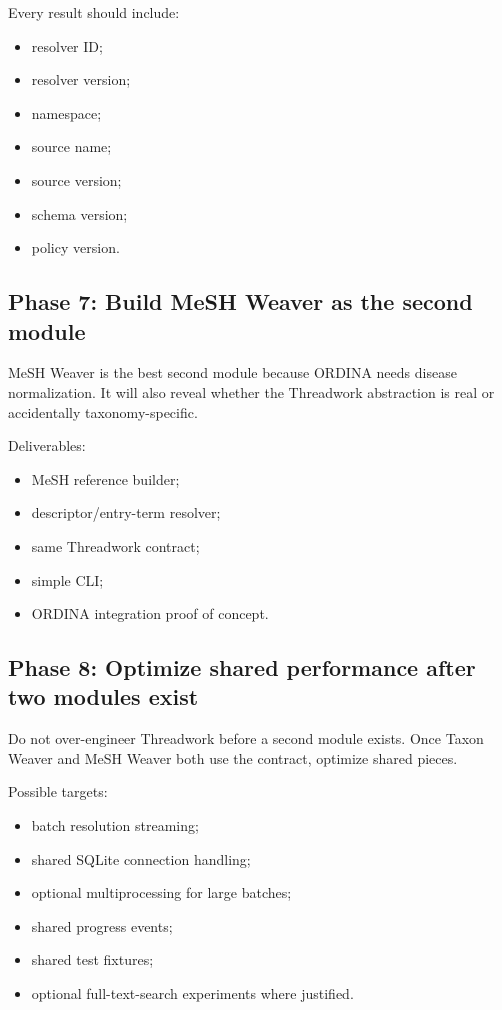 \documentclass[11pt,a4paper]{article}
\begin{document}
Every result should include:

\begin{itemize}
  \item resolver ID;
  \item resolver version;
  \item namespace;
  \item source name;
  \item source version;
  \item schema version;
  \item policy version.
\end{itemize}

\subsection{Phase 7: Build MeSH Weaver as the second module}

MeSH Weaver is the best second module because ORDINA needs disease normalization. It will also reveal whether the Threadwork abstraction is real or accidentally taxonomy-specific.

Deliverables:

\begin{itemize}
  \item MeSH reference builder;
  \item descriptor/entry-term resolver;
  \item same Threadwork contract;
  \item simple CLI;
  \item ORDINA integration proof of concept.
\end{itemize}

\subsection{Phase 8: Optimize shared performance after two modules exist}

Do not over-engineer Threadwork before a second module exists. Once Taxon Weaver and MeSH Weaver both use the contract, optimize shared pieces.

Possible targets:

\begin{itemize}
  \item batch resolution streaming;
  \item shared SQLite connection handling;
  \item optional multiprocessing for large batches;
  \item shared progress events;
  \item shared test fixtures;
  \item optional full-text-search experiments where justified.
\end{itemize}
\end{document}
